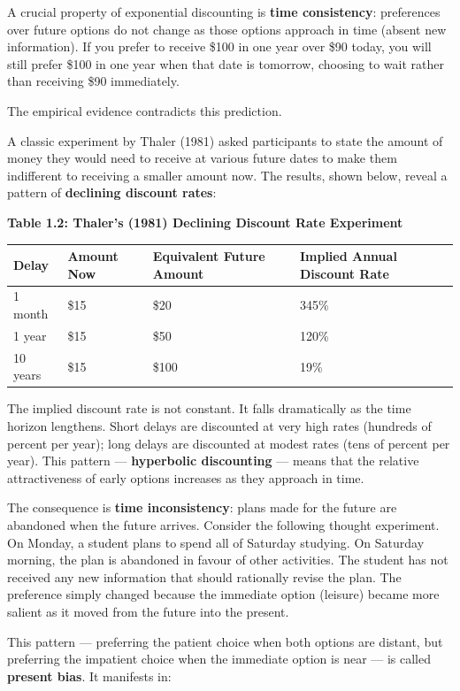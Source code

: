 \documentclass[12pt, letterpaper]{article}
\begin{document}
A crucial property of exponential discounting is \textbf{time consistency}: preferences over future options do not change as those options approach in time (absent new information). If you prefer to receive \$100 in one year over \$90 today, you will still prefer \$100 in one year when that date is tomorrow, choosing to wait rather than receiving \$90 immediately.

The empirical evidence contradicts this prediction.

A classic experiment by Thaler (1981) asked participants to state the amount of money they would need to receive at various future dates to make them indifferent to receiving a smaller amount now. The results, shown below, reveal a pattern of \textbf{declining discount rates}:

\textbf{Table 1.2: Thaler's (1981) Declining Discount Rate Experiment}


\begin{table}[H]
\centering
\small
\begin{tabularx}{\linewidth}{lXXX}
\toprule
Delay & Amount Now & Equivalent Future Amount & Implied Annual Discount Rate \\
\midrule
1 month & \$15 & \$20 & 345\% \\
1 year & \$15 & \$50 & 120\% \\
10 years & \$15 & \$100 & 19\% \\
\bottomrule
\end{tabularx}
\end{table}


The implied discount rate is not constant. It falls dramatically as the time horizon lengthens. Short delays are discounted at very high rates (hundreds of percent per year); long delays are discounted at modest rates (tens of percent per year). This pattern --- \textbf{hyperbolic discounting} --- means that the relative attractiveness of early options increases as they approach in time.

The consequence is \textbf{time inconsistency}: plans made for the future are abandoned when the future arrives. Consider the following thought experiment. On Monday, a student plans to spend all of Saturday studying. On Saturday morning, the plan is abandoned in favour of other activities. The student has not received any new information that should rationally revise the plan. The preference simply changed because the immediate option (leisure) became more salient as it moved from the future into the present.

This pattern --- preferring the patient choice when both options are distant, but preferring the impatient choice when the immediate option is near --- is called \textbf{present bias}. It manifests in:
\end{document}
